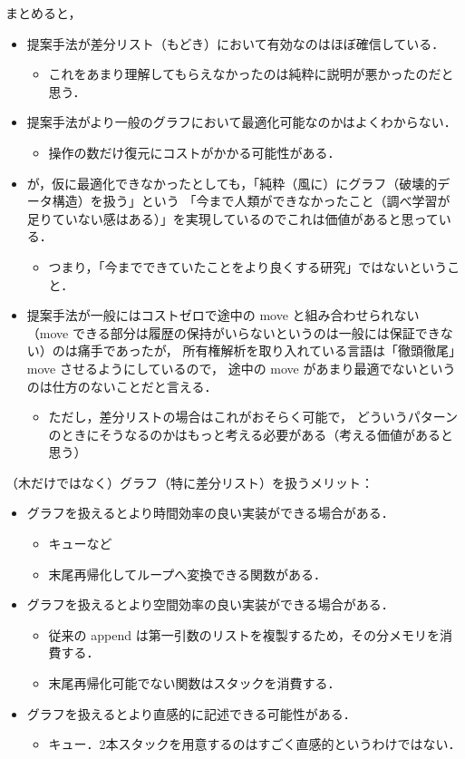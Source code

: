 \documentclass[10pt, a4j, twocolumn]{scrartcl}
\begin{document}
まとめると，
\begin{itemize}
\item 提案手法が差分リスト（もどき）において有効なのはほぼ確信している．
\begin{itemize}
\item これをあまり理解してもらえなかったのは純粋に説明が悪かったのだと思う．
\end{itemize}
\item 提案手法がより一般のグラフにおいて最適化可能なのかはよくわからない．
\begin{itemize}
\item 操作の数だけ復元にコストがかかる可能性がある．
\end{itemize}
\item が，仮に最適化できなかったとしても，「純粋（風に）にグラフ（破壊的データ構造）を扱う」という
「今まで人類ができなかったこと（調べ学習が足りていない感はある）」を実現しているのでこれは価値があると思っている．
\begin{itemize}
\item つまり，「今までできていたことをより良くする研究」ではないということ．
\end{itemize}
\item 提案手法が一般にはコストゼロで途中の move と組み合わせられない
（move できる部分は履歴の保持がいらないというのは一般には保証できない）のは痛手であったが，
所有権解析を取り入れている言語は「徹頭徹尾」move させるようにしているので，
途中の move があまり最適でないというのは仕方のないことだと言える．
\begin{itemize}
\item ただし，差分リストの場合はこれがおそらく可能で，
どういうパターンのときにそうなるのかはもっと考える必要がある（考える価値があると思う）
\end{itemize}
\end{itemize}


（木だけではなく）グラフ（特に差分リスト）を扱うメリット：
\begin{itemize}
\item グラフを扱えるとより時間効率の良い実装ができる場合がある．
\begin{itemize}
\item キューなど
\item 末尾再帰化してループへ変換できる関数がある．
\end{itemize}
\item グラフを扱えるとより空間効率の良い実装ができる場合がある．
\begin{itemize}
\item 従来の append は第一引数のリストを複製するため，その分メモリを消費する．
\item 末尾再帰化可能でない関数はスタックを消費する．
\end{itemize}
\item グラフを扱えるとより直感的に記述できる可能性がある．
\begin{itemize}
\item キュー．2本スタックを用意するのはすごく直感的というわけではない．
\end{itemize}
\end{itemize}
\end{document}
